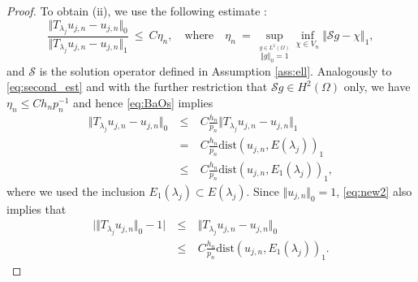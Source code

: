 \documentclass[preprint,12pt]{elsarticle}
\newcommand{\cS}{\mathcal{S}}
\begin{document}
\begin{proof}
To obtain  (ii),  we use the following estimate 
\cite[(3.31a)]{BaOs:89}:
\begin{equation}\label{eq:BaOs}\frac{\Vert T_{\lambda_j}u_{j, n} - u_{j, n}
  \Vert_{0}}{\Vert T_{\lambda_j}u_{j, n} - u_{j, n}
  \Vert_{1}} \ \leq \ C \eta_n, \quad 
\text{where} \quad \eta_n \ = \ \sup_{\stackrel{g \in L^2(\Omega)}{\Vert
    g\Vert_{0} = 1 }} \inf_{\chi \in V_n} \Vert \cS g - \chi
\Vert_{1}, \end{equation} and $\cS $ is the solution
operator defined in
Assumption \ref{ass:ell}. Analogously to \eqref{eq:second_est} and with the further restriction that $\cS g\in H^2(\Omega)$ only, we have
$\eta_n \leq C h_n p_n^{-1}$ and hence \eqref{eq:BaOs} implies
 \begin{eqnarray}
\Vert T_{\lambda_j}u_{j, n} - u_{j, n}
  \Vert_0 \ & \leq  & \  C     \frac{h_n}{p_n} \Vert T_{\lambda_j}u_{j, n} - u_{j, n}
  \Vert_1  \nonumber \\
& =  & \ C \frac{h_n}{p_n} \mathrm{dist} (u_{j,n}
,E(\lambda_j))_1  \nonumber  \\ 
& \leq & \  C   \frac{h_n}{p_n} \mathrm{dist} (u_{j,n}
,E_1(\lambda_j))_1,  \label{eq:new2}
 \end{eqnarray} 
where we used the inclusion $E_1(\lambda_j) \subset E(\lambda_j)$. 
Since $\Vert u_{j,n}\Vert_0 = 1$,  \eqref{eq:new2} also implies
that 
 \begin{eqnarray}
\bigg\vert \Vert T_{\lambda_j}u_{j, n} \Vert_0  -1 \bigg\vert \
& \leq  & \  \Vert T_{\lambda_j}u_{j, n} - u_{j, n}
  \Vert_0  \nonumber  \\
& \leq & \  C   \frac{h_n}{p_n} \mathrm{dist} (u_{j,n}
,E_1(\lambda_j))_1 . \label{eq:new4}
 \end{eqnarray} 

\end{proof}
\end{document}
